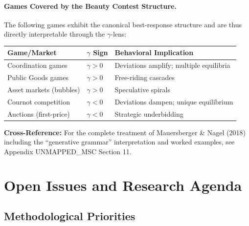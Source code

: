 \paragraph{Games Covered by the Beauty Contest Structure.}
The following games exhibit the canonical best-response structure and are thus
directly interpretable through the $\gamma$-lens:

\begin{center}
\renewcommand{\arraystretch}{1.2}
\begin{tabular}{@{}p{4.5cm}p{3cm}p{5cm}@{}}
\toprule
\textbf{Game/Market} & \textbf{$\gamma$ Sign} & \textbf{Behavioral Implication} \\
\midrule
Coordination games & $\gamma > 0$ & Deviations amplify; multiple equilibria \\
Public Goods games & $\gamma > 0$ & Free-riding cascades \\
Asset markets (bubbles) & $\gamma > 0$ & Speculative spirals \\
Cournot competition & $\gamma < 0$ & Deviations dampen; unique equilibrium \\
Auctions (first-price) & $\gamma < 0$ & Strategic underbidding \\
\bottomrule
\end{tabular}
\end{center}

\textbf{Cross-Reference:} For the complete treatment of Mauersberger \& Nagel (2018)
including the ``generative grammar'' interpretation and worked examples, see
Appendix UNMAPPED_MSC Section 11.


\section{Open Issues and Research Agenda}
\label{sec:B-open-issues}

\subsection{Methodological Priorities}

